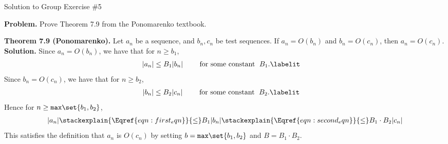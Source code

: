 \documentclass[10pt]{beamer}
\begin{document}
\begin{frame}{Solution to Group Exercise \#5}

\colorbox{yellow!30}{\textbf{Problem.}}  Prove Theorem 7.9 from the Ponomarenko textbook. 


\vfill
\colorbox{red!30}{\textbf{Theorem 7.9 (Ponomarenko).}} Let $a_n$ be a sequence, and $b_n,c_n$ be test sequences.  If $a_n = O(b_n)$ and $b_n = O(c_n)$, then $a_n = O(c_n)$.
\vfill 
\colorbox{green!30}{\textbf{Solution.}}
%
Since  $a_n = O(b_n)$, we have that for $n \geq b_1$,
\begin{align*}
|a_n| &\leq B_1 |b_n| \qquad \text{ for some constant } \; B_1.
\labelit \label{eqn:first_eqn}
\end{align*}
%
Since  $b_n = O(c_n)$, we have that for $n \geq b_2$,
\begin{align*}
|b_n| &\leq B_2 |c_n| \qquad \text{ for some constant } \; B_2.
\labelit \label{eqn:second_eqn}
\end{align*}
\vfill 
Hence for $n \geq \texttt{max} \set{b_1,b_2}$,
%
\begin{align*}
|a_n|  \stackexplain{\Eqref{eqn:first_eqn}}{\leq} B_1 |b_n| \stackexplain{\Eqref{eqn:second_eqn}}{\leq} B_1 \cdot B_2 |c_n| 
\end{align*}
%
This satisfies the definition that  $a_n$ is $O(c_n)$ by setting $b=\texttt{max} \set{b_1,b_2}$ and $B=B_1 \cdot B_2$. 
\end{frame}
\end{document}
